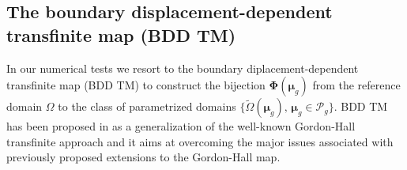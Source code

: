 \documentclass[12pt, a4paper, twoside, openright, notitlepage]{report}
\numberwithin{equation}{chapter}
\theoremstyle{theorem}
\theoremstyle{definition}
\theoremstyle{remark}
\theoremstyle{proposition}
\numberwithin{figure}{chapter}
\newcommand{\wt}[1]{\widetilde{#1}}
\newcommand{\bg}[1]{\boldsymbol{#1}}
\begin{document}
	\vspace*{0.3cm}
	
	\subsection{The boundary displacement-dependent transfinite map (BDD TM)}
	\label{section:The boundary displacement-dependent transfinite map}
	
		In our numerical tests we resort to the boundary diplacement-dependent transfinite map (BDD TM) to construct the bijection $\bg{\Phi}(\bg{\mu}_g)$ from the reference domain $\Omega$ to the class of parametrized domains $\big\lbrace \wt{\Omega}(\bg{\mu}_g), \, \bg{\mu}_g \in \mathcal{P}_g \big\rbrace$. BDD TM has been proposed in \cite{JIR14} as a generalization of the well-known Gordon-Hall transfinite approach and it aims at overcoming the major issues associated with previously proposed extensions to the Gordon-Hall map.
		
\end{document}
